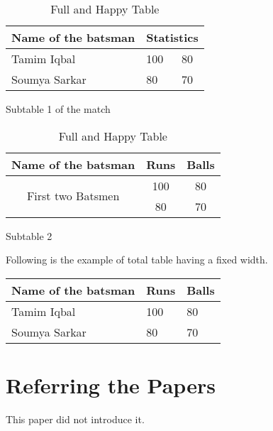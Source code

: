 \documentclass{article}
\begin{document}
\begin{table}[t!]
    \centering
    \begin{subtable}[t]{0.5\textwidth}
    \centering
        \begin{tabular}{||m{2cm}| m{2cm}| m{2cm}||}
        \hline
        Name of the batsman & \multicolumn{2}{c|}{Statistics} \\
        \hline
        \hline
        Tamim Iqbal & 100 & 80 \\
        \hline
        Soumya Sarkar & 80 & 70 \\
        \hline
        \end{tabular}
        \caption{Subtable 1 of the match}
        \label{subtab:1}
    \end{subtable}
    \begin{subtable}{0.5\textwidth}
    \centering
        \begin{tabular}{|c|c|c|}
        \hline
        Name of the batsman & Runs & Balls \\
        \hline
        \multirow{2}{*}{First two Batsmen} & 100 & 80 \\
        
        & 80 & 70 \\
        \hline
        \end{tabular}
        \caption{Subtable 2}
        \label{subtab:2}
    \end{subtable}
    \caption{Full and Happy Table}
    \label{tab:3}
\end{table}



Following is the example of total table having a fixed width.

\begin{tabu}to 0.8\textwidth{|X[c]|X[l]|X[r]|}
\hline
Name of the batsman & Runs & Balls \\[1ex]
\hline
\hline
Tamim Iqbal & 100 & 80 \\
\hline
Soumya Sarkar & 80 & 70 \\
\hline
\end{tabu}

\section{Referring the Papers}
This paper\cite{Han:2000} did not introduce it.
\printbibliography
%
%
\end{document}
